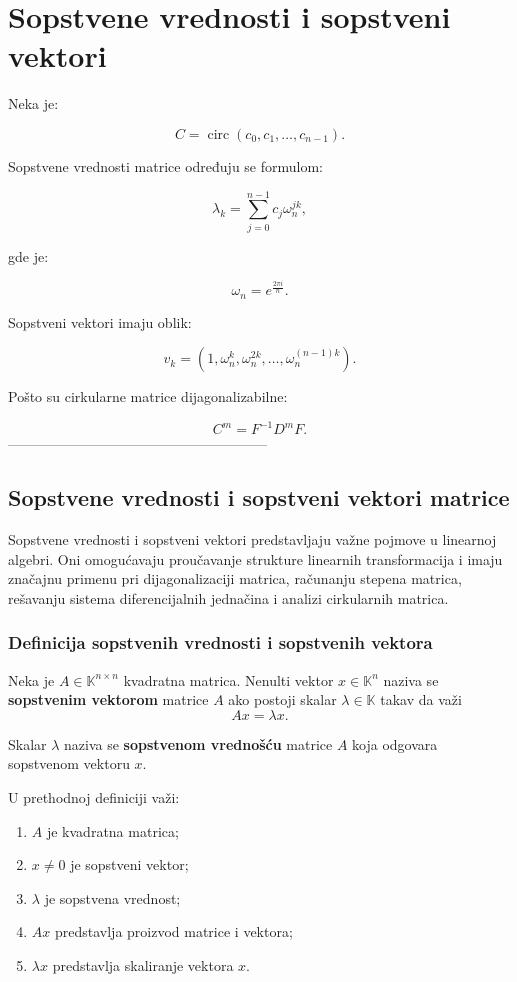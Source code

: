 \documentclass[12pt,a4paper]{report}
\begin{document}
\chapter{Sopstvene vrednosti i sopstveni vektori}

Neka je:

\[
C = \operatorname{circ}(c_0,c_1,\dots,c_{n-1}).
\]

Sopstvene vrednosti matrice određuju se formulom:

\[
\lambda_k = \sum_{j=0}^{n-1} c_j \omega_n^{jk},
\]

gde je:

\[
\omega_n = e^{\frac{2\pi i}{n}}.
\]

Sopstveni vektori imaju oblik:

\[
v_k = (1,\omega_n^k,\omega_n^{2k},\dots,\omega_n^{(n-1)k}).
\]

Pošto su cirkularne matrice dijagonalizabilne:

\[
C^m = F^{-1}D^mF.
\]
--------------------------------------------------------

\section{Sopstvene vrednosti i sopstveni vektori matrice}

Sopstvene vrednosti i sopstveni vektori predstavljaju važne
pojmove u linearnoj algebri. Oni omogućavaju proučavanje
strukture linearnih transformacija i imaju značajnu primenu
pri dijagonalizaciji matrica, računanju stepena matrica,
rešavanju sistema diferencijalnih jednačina i analizi
cirkularnih matrica.

\subsection{Definicija sopstvenih vrednosti i sopstvenih vektora}


Neka je $A\in\mathbb{K}^{n\times n}$ kvadratna matrica.
Nenulti vektor $x\in\mathbb{K}^n$ naziva se
\textbf{sopstvenim vektorom} matrice $A$ ako postoji
skalar $\lambda\in\mathbb{K}$ takav da važi
\[
Ax=\lambda x.
\]

Skalar $\lambda$ naziva se \textbf{sopstvenom vrednošću}
matrice $A$ koja odgovara sopstvenom vektoru $x$.


U prethodnoj definiciji važi:
\begin{enumerate}
	\item $A$ je kvadratna matrica;
	\item $x\neq 0$ je sopstveni vektor;
	\item $\lambda$ je sopstvena vrednost;
	\item $Ax$ predstavlja proizvod matrice i vektora;
	\item $\lambda x$ predstavlja skaliranje vektora $x$.
\end{enumerate}
\end{document}
